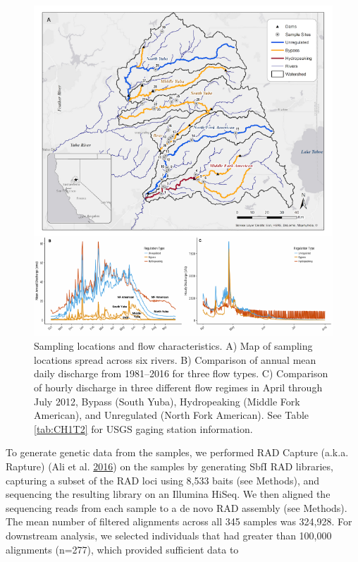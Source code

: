 \documentclass[proquest,12pt,final]{ucthesis-CA2012} %
\begin{document}
\begin{ucmainmatter}
\begin{figure}
\includegraphics[width=1\linewidth]{figure/ch1/fig_01_ac_map_hydrographs} \caption{Sampling locations and flow characteristics. A) Map of
sampling locations spread across six rivers. B) Comparison of annual
mean daily discharge from 1981--2016 for three flow types. C) Comparison
of hourly discharge in three different flow regimes in April through
July 2012, Bypass (South Yuba), Hydropeaking (Middle Fork American), and
Unregulated (North Fork American). See Table \ref{tab:CH1T2} for USGS
gaging station information.}\label{fig:CH1F1map}
\end{figure}
To generate genetic data from the samples, we performed RAD Capture
(a.k.a. Rapture) (Ali et al. \protect\hyperlink{ref-ali_rad_2016}{2016})
on the samples by generating SbfI RAD libraries, capturing a subset of
the RAD loci using 8,533 baits (see Methods), and sequencing the
resulting library on an Illumina HiSeq. We then aligned the sequencing
reads from each sample to a de novo RAD assembly (see Methods). The mean
number of filtered alignments across all 345 samples was 324,928. For
downstream analysis, we selected individuals that had greater than
100,000 alignments (n=277), which provided sufficient data to

\end{ucmainmatter}
\end{document}
